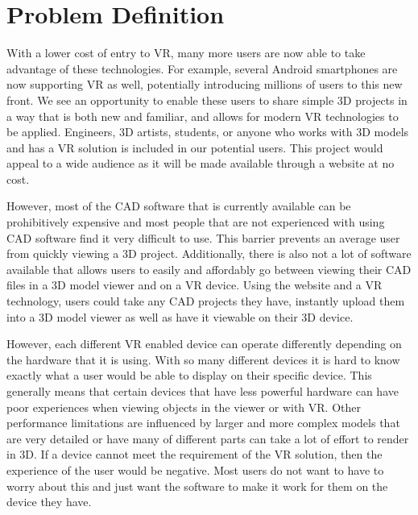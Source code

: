 \documentclass[letterpaper,10pt,draftclsnofoot,onecolumn, titlepage]{IEEEtran}
\begin{document}
\section{Problem Definition}
{With a lower cost of entry to VR, many more users are now able to take advantage of these technologies. For example, several Android smartphones are now supporting VR as well, potentially introducing millions of users to this new front. We see an opportunity to enable these users to share simple 3D projects in a way that is both new and familiar, and allows for modern VR technologies to be applied. Engineers, 3D artists, students, or anyone who works with 3D models and has a VR solution is included in our potential users. This project would appeal to a wide audience as it will be made available through a website at no cost. 

However, most of the CAD software that is currently available can be prohibitively expensive and most people that are not experienced with using CAD software find it very difficult to use. This barrier prevents an average user from quickly viewing a 3D project. Additionally, there is also not a lot of software available that allows users to easily and affordably go between viewing their CAD files in a 3D model viewer and on a VR device. Using the website and a VR technology, users could take any CAD projects they have, instantly upload them into a 3D model viewer as well as have it viewable on their 3D device. 

However, each different VR enabled device can operate differently depending on the hardware that it is using. With so many different devices it is hard to know exactly what a user would be able to display on their specific device. This generally means that certain devices that have less powerful hardware can have poor experiences when viewing objects in the viewer or with VR. Other performance limitations are influenced by larger and more complex models that are very detailed or have many of different parts can take a lot of effort to render in 3D. If a device cannot meet the requirement of the VR solution, then the experience of the user would be negative. Most users do not want to have to worry about this and just want the software to make it work for them on the device they have. 
 
 
\par}
\end{document}
